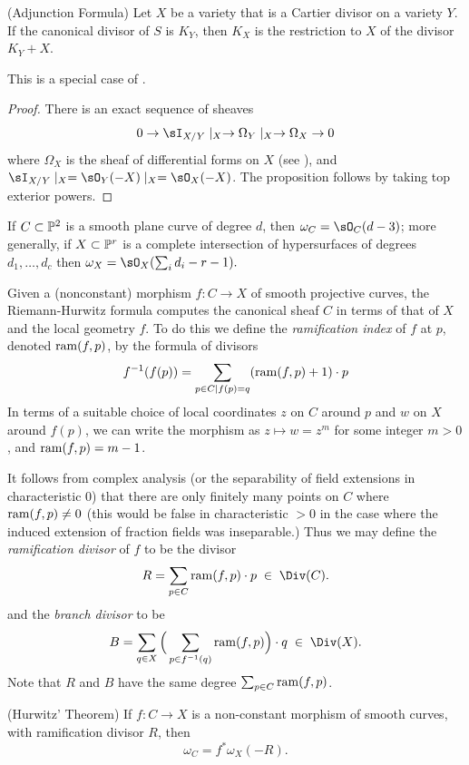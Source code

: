 \begin{proposition}\label{adjunction}(Adjunction Formula)
 Let $X$ be a variety that is a Cartier divisor on a variety $Y$. If the canonical divisor of $S$ is $K_{Y}$, then
 $K_{X}$ is the restriction to $X$ of the divisor $K_{Y}+X$.
\end{proposition}
This is a special case of \cite[****]{H}.
\begin{proof}
 There is an exact sequence of sheaves
 $$
0\to  \sI_{X/Y}\mid_{X} \to \Omega_{Y}\mid _{X} \to \Omega_{X} \to 0
 $$
 where $\Omega_{X}$ is the sheaf of differential forms on $X$ (see \cite[Theorem ***]{E}), and
$ \sI_{X/Y}\mid_{X} = \sO_{Y}(-X)\mid_{X} = \sO_{X}(-X)$. The proposition follows by taking top exterior powers.
\end{proof}

\begin{corollary}\label{canonical of plane curve}
If $C\subset \PP^{2}$ is a smooth plane curve of degree $d$, then $\omega_{C} = \sO_{C}(d-3)$; more generally, if
$X\subset \PP^{r}$ is a complete intersection of hypersurfaces of degrees $d_{1},\dots, d_{c}$ then
$\omega_{X} = \sO_{X}(\sum_{i}d_{i }-r-1).$
\end{corollary}

 Given a (nonconstant) morphism $f : C \to X$ of smooth projective curves, the Riemann-Hurwitz formula computes the canonical sheaf  $C$ in terms of that of  $X$ and the local geometry $f$. To do this we define the
\emph{ramification index} of $f$ at $p$,  denoted $\ram(f,p)$, by the formula of divisors
$$
 f^{-1}(f(p)) = \sum_{p\in C \mid f(p)=q} (\ram(f,p)+1)\cdot p
 $$
In terms of a suitable choice of local coordinates $z$ on $C$ around $p$ and $w$ on $X$ around $f(p)$, we can write the morphism as $z \mapsto w = z^m$ for some integer $m > 0$, and $\ram(f,p) = m-1$.

It follows from complex analysis (or the separability of field extensions in characteristic 0) that there are only finitely many
points on $C$ where $\ram(f,p) \neq 0$ (this would be false in characteristic $>0$ in the case where the
induced extension of fraction fields was inseparable.) Thus we may define the \emph{ramification divisor} of $f$ to be the divisor
 $$
 R = \sum_{p \in C} \ram(f,p)\cdot p \; \in \;  \Div(C).
 $$
 and the \emph{branch divisor} to be
 $$
 B = \sum_{q \in X} \Big(\sum_{p \in f^{-1}(q)} \ram(f,p) \Big)\cdot q \; \in \; \Div(X).
 $$
 Note that $R$ and $B$ have the same degree $\sum_{p \in C} \ram(f,p)$. 

 
\begin{theorem}(Hurwitz' Theorem) \cite[****]{H} \label{Hurwitz}
If $f:C\to X$ is a non-constant morphism of smooth curves, with ramification divisor $R$, then 
$$
\omega_{C} = f^{*}\omega_{X}(-R).
$$
\end{theorem}
 
